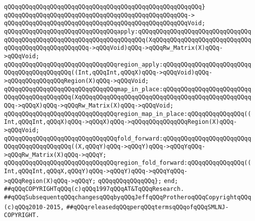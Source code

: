 \verb|qQQqqQQqqQQqqQQqqQQqqQQqqQQqqQQqqQQqqQQqqQQqqQQqqQQqqQQq}|\newline
\verb|qQQqqQQqqQQqqQQqqQQqqQQqqQQqqQQqqQQqqQQqqQQqqQQqqQQq->|\newline
\verb|qQQqqQQqqQQqqQQqqQQqqQQqqQQqqQQqqQQqqQQqqQQqqQQqqQQqVoid;|\newline
\newline
\verb|qQQqqQQqqQQqqQQqqQQqqQQqqQQqqQQqapply:qQQqqQQqqQQqqQQqqQQqqQQqqQQqqQQqqQQqqQQqqQQqqQQqqQQqqQQqqQQqqQQqqQQqqQQq(XqQQqqQQqqQQqqQQqqQQqqQQqqQQqqQQqqQQqqQQqqQQqqQQqqQQq->qQQqVoid)qQQq->qQQqRw_Matrix(X)qQQq->qQQqVoid;|\newline
\verb|qQQqqQQqqQQqqQQqqQQqqQQqqQQqqQQqregion_apply:qQQqqQQqqQQqqQQqqQQqqQQqqQQqqQQqqQQqqQQqqQQq((Int,qQQqInt,qQQqX)qQQq->qQQqVoid)qQQq->qQQqqQQqqQQqqQQqRegion(X)qQQq->qQQqVoid;|\newline
\newline
\verb|qQQqqQQqqQQqqQQqqQQqqQQqqQQqqQQqmap_in_place:qQQqqQQqqQQqqQQqqQQqqQQqqQQqqQQqqQQqqQQqqQQq(XqQQqqQQqqQQqqQQqqQQqqQQqqQQqqQQqqQQqqQQqqQQqqQQqqQQq->qQQqX)qQQq->qQQqRw_Matrix(X)qQQq->qQQqVoid;|\newline
\verb|qQQqqQQqqQQqqQQqqQQqqQQqqQQqqQQqregion_map_in_place:qQQqqQQqqQQqqQQq((Int,qQQqInt,qQQqX)qQQq->qQQqX)qQQq->qQQqqQQqqQQqqQQqRegion(X)qQQq->qQQqVoid;|\newline
\newline
\verb|qQQqqQQqqQQqqQQqqQQqqQQqqQQqqQQqfold_forward:qQQqqQQqqQQqqQQqqQQqqQQqqQQqqQQqqQQqqQQqqQQq((X,qQQqY)qQQq->qQQqY)qQQq->qQQqYqQQq->qQQqRw_Matrix(X)qQQq->qQQqY;|\newline
\verb|qQQqqQQqqQQqqQQqqQQqqQQqqQQqqQQqregion_fold_forward:qQQqqQQqqQQqqQQq((Int,qQQqInt,qQQqX,qQQqY)qQQq->qQQqY)qQQq->qQQqYqQQq->qQQqRegion(X)qQQq->qQQqY;|\newline
\newline
\verb|qQQqqQQqqQQqqQQq};|\newline
\verb|end;|\newline
\newline
\newline
\verb|##qQQqCOPYRIGHTqQQq(c)qQQq1997qQQqAT&TqQQqResearch.|\newline
\verb|##qQQqSubsequentqQQqchangesqQQqbyqQQqJeffqQQqProtheroqQQqCopyrightqQQq(c)qQQq2010-2015,|\newline
\verb|##qQQqreleasedqQQqperqQQqtermsqQQqofqQQqSMLNJ-COPYRIGHT.|\newline

